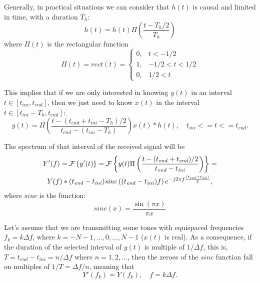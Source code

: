 Generally, in practical situations we can consider that $h(t)$ is causal and limited in time, with a duration $T_h$:
\begin{equation}
h(t) = h(t) \Pi\left(\frac{t - T_h/2}{T_h}\right)
\end{equation}
where $\Pi(t)$ is the rectangular function
\begin{equation}
\Pi(t) = \mathit{rect}(t) = \begin{cases}
0, & t < -1/2 \\
1, & -1/2 < t < 1/2 \\
0, & 1/2 < t
\end{cases}
\end{equation}

This implies that if we are only interested in knowing $y(t)$ in an interval $t \in [t_\mathit{ini}, t_\mathit{end}]$, then we just need to know $x(t)$ in the interval $t \in [t_\mathit{ini} - T_h, t_\mathit{end}]$:
\begin{equation}
y(t) = \Pi\left(\frac{t - (t_\mathit{end} + t_\mathit{ini} - T_h)/2}{t_\mathit{end} - (t_\mathit{ini} - T_h)}\right) x(t) \ast h(t), \quad t_\mathit{ini} <= t <= t_\mathit{end}.
\end{equation}

The spectrum of that interval of the received signal will be
\begin{multline}
Y'(f) = \FourierTransform{y'(t)} = \FourierTransform{y(t) \Pi\left(\frac{t - (t_\mathit{end} + t_\mathit{end})/2}{t_\mathit{end} - t_\mathit{ini}}\right)} = \\ Y(f) \ast (t_\mathit{end} - t_\mathit{ini}) \mathit{sinc}\left((t_\mathit{end} - t_\mathit{ini}) f \right) e^{-j 2 \pi f \frac{(t_\mathit{end} + t_\mathit{ini})}{2}},
\end{multline}
where $\mathit{sinc}$ is the function:
\begin{equation}
\mathit{sinc}(x) = \frac{\sin(\pi x)}{\pi x}
\end{equation}

Let's assume that we are transmitting some tones with equispaced frequencies $f_k = k \Delta f$, where $k = -N - 1, ..., 0, ..., N-1$ ($x(t)$ is real). As a consequence, if the duration of the selected interval of $y(t)$ is multiple of $1/\Delta f$, this is, $T = t_\mathit{end} - t_\mathit{ini} = n/\Delta f$ where $n = 1, 2, ...$, then the zeroes of the $\mathit{sinc}$ function fall on multiples of $1/T = \Delta f / n$, meaning that 
\begin{equation}
Y'(f_k) = Y(f_k), \quad f = k \Delta f.
\end{equation}

